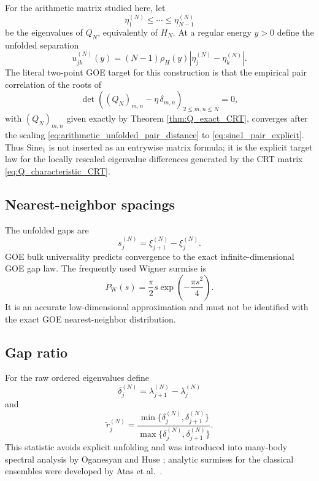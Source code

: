 \documentclass[11pt]{amsart}
\numberwithin{equation}{section}
\theoremstyle{plain}
\theoremstyle{definition}
\theoremstyle{remark}
\begin{document}
For the arithmetic matrix studied here, let
\begin{equation}
\eta_1^{(N)}\le\cdots\le\eta_{N-1}^{(N)}
\end{equation}
be the eigenvalues of $Q_N$, equivalently of $H_N$.  At a regular energy $y>0$ define the unfolded separation
\begin{equation}
u_{jk}^{(N)}(y)
=(N-1)\rho_H(y)\left|\eta_j^{(N)}-\eta_k^{(N)}\right|.
\label{eq:arithmetic_unfolded_pair_distance}
\end{equation}
The literal two-point GOE target for this construction is that the empirical pair correlation of the roots of
\begin{equation}
\det\!\left((Q_N)_{m,n}-\eta\,\delta_{m,n}\right)_{2\le m,n\le N}=0,
\label{eq:Q_characteristic_CRT}
\end{equation}
with $(Q_N)_{m,n}$ given exactly by Theorem \ref{thm:Q_exact_CRT}, converges after the scaling \eqref{eq:arithmetic_unfolded_pair_distance} to \eqref{eq:sine1_pair_explicit}.  Thus $\mathrm{Sine}_1$ is not inserted as an entrywise matrix formula; it is the explicit target law for the locally rescaled eigenvalue differences generated by the CRT matrix \eqref{eq:Q_characteristic_CRT}.

\subsection{Nearest-neighbor spacings}
\label{subsec:nearest_neighbor}

The unfolded gaps are
\begin{equation}
s_j^{(N)}=\xi_{j+1}^{(N)}-\xi_j^{(N)}.
\label{eq:unfolded_gap}
\end{equation}
GOE bulk universality predicts convergence to the exact infinite-dimensional GOE gap law.  The frequently used Wigner surmise is
\begin{equation}
P_{\mathrm W}(s)
=
\frac{\pi}{2}s\exp\!\left(-\frac{\pi s^2}{4}\right).
\label{eq:wigner_surmise}
\end{equation}
It is an accurate low-dimensional approximation and must not be identified with the exact GOE nearest-neighbor distribution.

\subsection{Gap ratio}
\label{subsec:gap_ratio}

For the raw ordered eigenvalues define
\begin{equation}
\delta_j^{(N)}=\lambda_{j+1}^{(N)}-\lambda_j^{(N)}
\label{eq:raw_gap}
\end{equation}
and
\begin{equation}
\widetilde r_j^{(N)}
=
\frac{\min\{\delta_j^{(N)},\delta_{j+1}^{(N)}\}}
{\max\{\delta_j^{(N)},\delta_{j+1}^{(N)}\}}.
\label{eq:ratio_statistic}
\end{equation}
This statistic avoids explicit unfolding and was introduced into many-body spectral analysis by Oganesyan and Huse \cite{OganesyanHuse2007}; analytic surmises for the classical ensembles were developed by Atas et al.\ \cite{Atas2013}.
\end{document}
